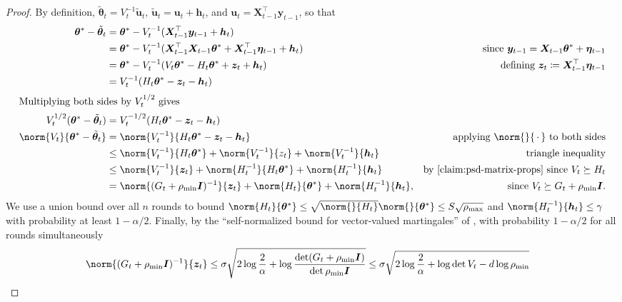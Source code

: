 \documentclass{article}
\renewcommand{\vec}[1]{\bm{#1}}
\newcommand{\wildcard}{\mathinner{\,{\cdot}\,}}
\newcommand{\defeq}{\coloneq}
\newcommand{\inv}[1]{#1^{-1}}
\renewcommand{\det}{\operatorname{det}}
\providecommand\transp{\top}
\let\transpsymbol\transp
\renewcommand{\transp}[1]{#1^\transpsymbol}
\newcommand{\Eye}[1][]{\bm{I}\notblank{#1}{_{{#1}\times{#1}}}{}}
\newcommand{\XtX}[1]{\transp{#1}{#1}}
\begin{document}
\begin{proof}
  By definition, $\tilde{\vec\theta}_t = \inv{V_t} \tilde{\vec u}_t$,
  $\tilde{\vec u}_t = \vec u_t + \vec h_t$, and $\vec u_t = \transp{\vec
    X_{t-1}} \vec y_{t-1}$, so that
  \begin{align*}
    \vec\theta^* - \tilde{\vec\theta}_t
    &= \vec\theta^* - \inv{V_t}(\transp{\vec X_{t-1}} \vec y_{t-1} + \vec h_t) \\
    &= \vec\theta^* - \inv{V_t}(\XtX{\vec X_{t-1}} \vec\theta^*
      + \transp{\vec X_{t-1}} \vec\eta_{t-1} + \vec h_t)
    &\text{since } \vec y_{t-1} = \vec X_{t-1} \vec\theta^* + \vec\eta_{t-1} \\
    &= \vec\theta^* - \inv{V_t}(V_t \vec\theta^* - H_t \vec\theta^* + \vec z_t + \vec h_t)
    &\text{defining } \vec z_t \defeq \transp{\vec X_{t-1}} \vec\eta_{t-1} \\
    &= \inv{V_t}(H_t\vec\theta^* - \vec z_t - \vec h_t) \\
    \shortintertext{Multiplying both sides by $V_t^{1/2}$ gives}
    V_t^{1/2}(\vec\theta^* - \tilde{\vec\theta}_t)
    &= V_t^{-1/2}(H_t\vec\theta^* - \vec z_t - \vec h_t) \\
    \norm{V_t}{\vec\theta^* - \tilde{\vec\theta}_t}
    &= \norm{\inv{V_t}}{H_t\vec\theta^* - \vec z_t - \vec h_t}
    &\text{applying $\norm{}{\wildcard}$ to both sides}\\
    &\le \norm{\inv{V_t}}{H_t\vec\theta^*} + \norm{\inv{V_t}}{z_t}
      + \norm{\inv{V_t}}{\vec h_t} &\text{triangle inequality} \\
    &\le \norm{\inv{V_t}}{\vec z_t} + \norm{\inv{H_t}}{H_t\vec\theta^*}
      + \norm{\inv{H_t}}{\vec h_t}
    &\text{by \cref{claim:psd-matrix-props} since } V_t \succeq H_t \\
    &= \norm{\inv{(G_t+\rho_{\min}\Eye)}}{\vec z_t} + \norm{H_t}{\vec\theta^*} +
      \norm{\inv{H_t}}{\vec h_t},
    &\text{since } V_t \succeq G_t + \rho_{\min}\Eye.
  \end{align*}
  We use a union bound over all $n$ rounds to bound
  $\norm{H_t}{\vec\theta^*} \le
  \sqrt{\norm{}{H_t}}\norm{}{\vec\theta^*} \le S\sqrt{\rho_{\max}}$
  and $\norm{\inv{H_t}}{\vec h_t} \le \gamma$ with probability at
  least $1-\alpha/2$.  Finally, by the ``self-normalized bound for
  vector-valued martingales'' of
  \citet[Theorem~1]{AbbasiYadkoriImprovedAlgorithmsLinear2011}, with
  probability $1-\alpha/2$ for all rounds simultaneously
  \begin{align*}
    \norm{\inv{(G_t + \rho_{\min}\Eye)}}{\vec z_t}
    &\le \sigma\sqrt{2\log\frac{2}{\alpha} + \log\frac{\det(G_t+\rho_{\min}\Eye)}{\det\rho_{\min}\Eye}}
      \le \sigma\sqrt{2\log\frac{2}{\alpha} + \log\det V_t - d\log\rho_{\min}} \qedhere
  \end{align*}
\end{proof}
\end{document}
